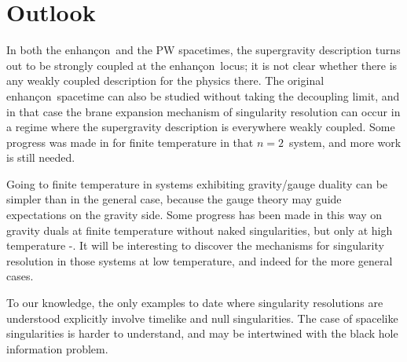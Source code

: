 \documentclass[a4paper,12pt]{amsproc}
\numberwithin{equation}{section}
\def\ls{\ell_{\rm{s}}}
\def\enh{enhan\c con}
\def\net{$n{=}2$}
\begin{document}
%
%
%
\section{Outlook}

In both the \enh\ and the PW spacetimes, the supergravity description
turns out to be strongly coupled at the \enh\ locus; it is not clear
whether there is any weakly coupled description for the physics there.
The original \enh\ spacetime can also be studied without taking the
decoupling limit, and in that case the brane expansion mechanism of
singularity resolution can occur in a regime where the supergravity
description is everywhere weakly coupled.  Some progress was made in
\cite{jmpr} for finite temperature in that \net\ system, and more work
is still needed.

Going to finite temperature in systems exhibiting gravity/gauge
duality can be simpler than in the general case, because the gauge
theory may guide expectations on the gravity side.  Some progress has
been made in this way on gravity duals at finite temperature without
naked singularities, but only at high temperature
\cite{highT1}-\cite{highT5}.  It will be interesting to discover the
mechanisms for singularity resolution in those systems at low
temperature, and indeed for the more general cases.

To our knowledge, the only examples to date where singularity
resolutions are understood explicitly involve timelike and null
singularities.  The case of spacelike singularities is harder to
understand, and may be intertwined with the black hole information
problem.
\end{document}
